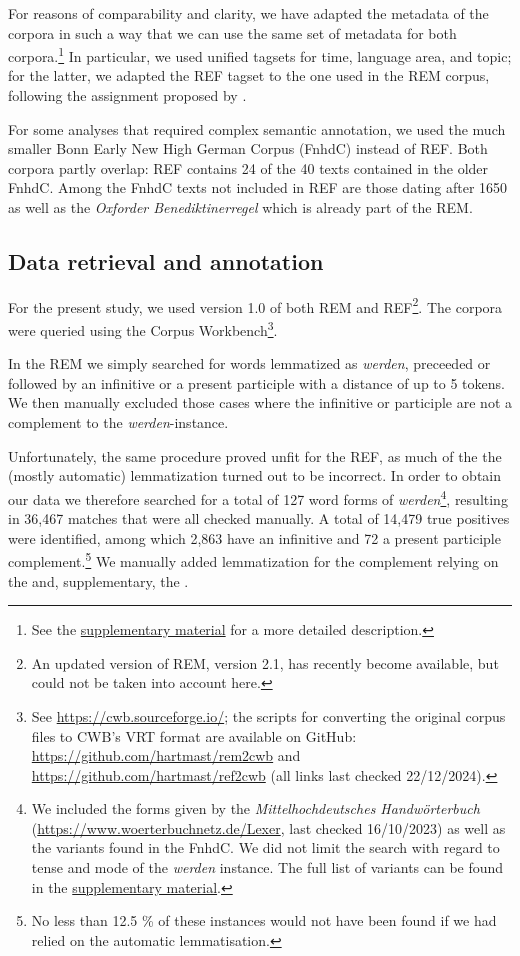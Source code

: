 \documentclass[output=paper,colorlinks,citecolor=brown]{langscibook}
\begin{document}
For reasons of comparability and clarity, we have adapted the metadata of the corpora in such a way that we can use the same set of metadata for both corpora.\footnote{See the \hyperref[sec:hs:dataavailability]{supplementary material} for a more detailed description.}  In particular, we used unified tagsets for time, language area, and topic; for the latter, we adapted the REF tagset to the one used in the REM corpus, following the assignment proposed by \citet[7]{kopfKorpusKorpusHerausforderungen2019}.

For some analyses that required complex semantic annotation, we used the much smaller Bonn Early New High German Corpus (FnhdC) instead of REF. Both corpora partly overlap: REF contains 24 of the 40 texts contained in the older FnhdC. Among the FnhdC texts not included in REF are those dating after 1650 as well as the  \textit{Oxforder Benediktinerregel} which is already part of the REM. 

\subsection{Data retrieval and annotation} \label{sec:hs:retrieval} 
For the present study, we used version 1.0 of both REM and REF\footnote{An updated version of REM, version 2.1, has recently become available, but could not be taken into account here.}. The corpora were queried using the Corpus Workbench\footnote{See \href{https://cwb.sourceforge.io/}{https://cwb.sourceforge.io/}; the scripts for converting the original corpus files to CWB's VRT format are available on GitHub: \href{https://github.com/hartmast/rem2cwb}{https://github.com/hartmast/rem2cwb} and \href{https://github.com/hartmast/ref2cwb}{https://github.com/hartmast/ref2cwb} (all links last checked 22/12/2024).}.

In the REM we simply searched for words lemmatized as \textit{werden}, preceeded or followed by an infinitive or a present participle with a distance of up to 5 tokens. We then manually excluded those cases where the infinitive or participle are not a complement to the \textit{werden}-instance. 

Unfortunately, the same procedure proved unfit for the REF, as much of the the (mostly automatic) lemmatization turned out to be incorrect. In order to obtain our data we therefore searched for a total of 127 word forms of \textit{werden}\footnote{We included the forms given by the \textit{Mittelhochdeutsches Handwörterbuch} (\url{https://www.woerterbuchnetz.de/Lexer}, last checked 16/10/2023) as well as the variants found in the FnhdC. We did not limit the search with regard to tense and mode of the \textit{werden} instance. The full list of variants can be found in the \hyperref[sec:hs:dataavailability]{supplementary material}.}, resulting in 36,467 matches that were all checked manually. A total of 14,479 true positives were identified, among which 2,863 have an infinitive and 72 a present participle complement.\footnote{No less than 12.5 \% of these instances would not have been found if we had relied on the automatic lemmatisation.}  We manually added lemmatization for the complement relying on the  and, supplementary, the .   
\end{document}
